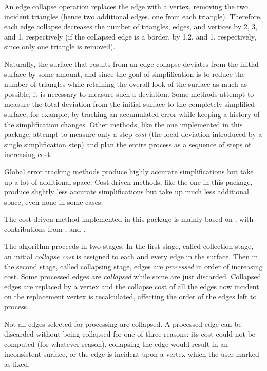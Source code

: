 An edge collapse operation replaces the edge with a vertex, removing the two incident 
triangles (hence two additional edges, one from each triangle). Therefore, each edge collapse 
decreases the number of triangles, edges, and vertices by 2, 3, and 1, respectively 
(if the collapsed edge is a border, by 1,2, and 1, respectively, since only one triangle 
is removed).

Naturally, the surface that results from an edge collapse deviates from the initial 
surface by some amount, and since the goal of simplification is to reduce the number 
of triangles while retaining the overall look of the surface as much as possible, 
it is necessary to measure such a deviation. Some methods attempt to measure the 
total deviation from the initial surface to the completely simplified surface, 
for example, by tracking an accumulated error while keeping a history of the simplification 
changes. Other methods, like the one implemented in this package, attempt to measure only
a step {\em cost} (the local deviation introduced by a single simplification step) and 
plan the entire process as a sequence of steps of increasing cost. 

Global error tracking methods produce highly accurate simplifications but take up a lot 
of additional space. Cost-driven methods, like the one in this package, produce slightly 
less accurate simplifications but take up much less additional space, even none in some cases.

The cost-driven method implemented in this package is mainly based on \cite[Memoryless simplification]{cgal:lt-fmeps-98,cgal:lt-ems-99}, with contributions from \cite[Mesh Optimization]{hddms-mo-93}, \cite[Surface simplification using quadric error metrics]{gh-ssqem-97}
and \cite[Topology preserving edge contraction]{degn-tpec-98}.

The algorithm proceeds in two stages. In the first stage, called collection stage, 
an initial {\em collapse cost} is assigned to each and every edge in the surface.
Then in the second stage, called collapsing stage, edges are 
{\em processed} in order of increasing cost. Some processed edges are {\em collapsed} 
while some are just discarded. Collapsed edges are replaced by a vertex and the collapse 
cost of all the edges now incident on the replacement vertex is recalculated, affecting 
the order of the edges left to process.

Not all edges selected for processing are collapsed. A processed edge can be discarded 
without being collapsed for one of three reasons: its cost could not be computed 
(for whatever reason), collapsing the edge would result in an inconsistent surface, 
or the edge is incident upon a vertex which the user marked as fixed.

